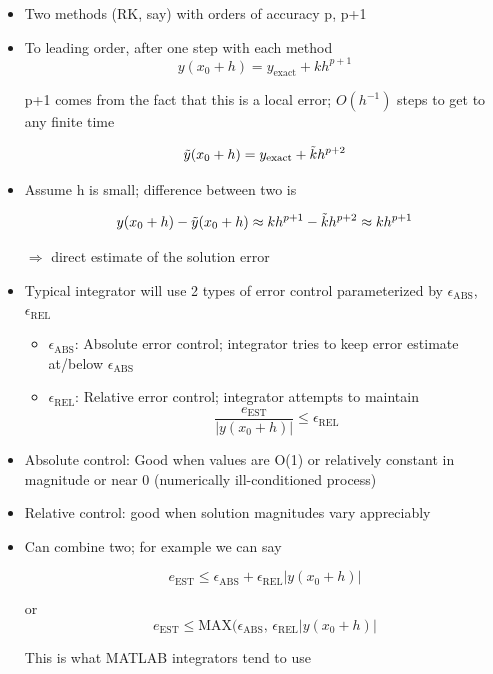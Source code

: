 \begin{itemize}
    \item Two methods (RK, say) with orders of accuracy p, p+1
    \item To leading order, after one step with each method 
    \[ y(x_0+h) = y_{\text{exact}} + k h^{p+1}\]

    p+1 comes from the fact that this is a local error; $O(h^{-1})$ steps to get to any finite time

    \[ \Tilde{y}(x_0+h) = y_{\text{exact}} + \Tilde{k} h^{p+2}\]

    \item Assume h is small; difference between two is

    \[ y(x_0+h) - \Tilde{y}(x_0+h) \approx kh^{p+1} - \Tilde{k}h^{p+2} \approx k h^{p+1}\]

    $\Rightarrow$ direct estimate of the solution error

    \item Typical integrator will use 2 types of error control parameterized by $\epsilon_{\text{ABS}}$, $\epsilon_{\text{REL}}$

    \begin{itemize}
        \item $\epsilon_{\text{ABS}}$: Absolute error control; integrator tries to keep error estimate at/below $\epsilon_{\text{ABS}}$
        \item $\epsilon_{\text{REL}}$: Relative error control; integrator attempts to maintain
        \[\frac{e_{\text{EST}}}{|y(x_0+h)|} \le \epsilon_{\text{REL}}\]
    \end{itemize}

    \item Absolute control: Good when values are O(1) or relatively constant in magnitude or near 0 (numerically ill-conditioned process)

    \item Relative control: good when solution magnitudes vary appreciably 

    \item Can combine two; for example we can say

    \[ e_{\text{EST}} \le \epsilon_{\text{ABS}} + \epsilon_{\text{REL}} |y(x_0+h)|\]

    or \[ e_{\text{EST}} \le \text{MAX}(\epsilon_{\text{ABS}}\text{, } \epsilon_{\text{REL}} |y(x_0+h)|\]

    This is what MATLAB integrators tend to use
\end{itemize}


